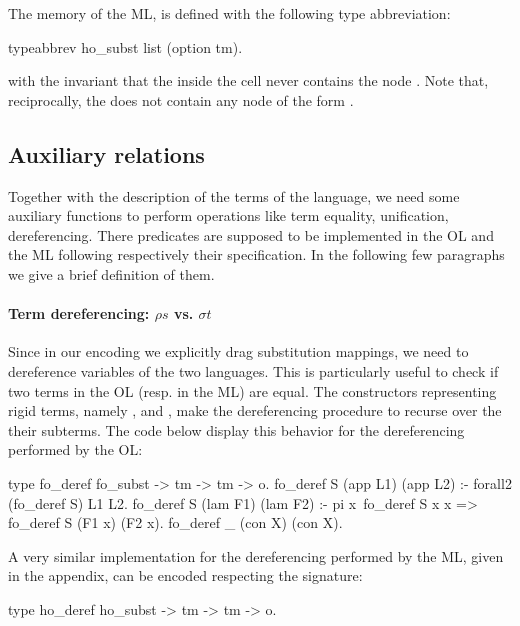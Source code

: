 \documentclass[sigconf,natbib=false]{acmart}
\begin{document}
The memory of the ML, is defined with the following type abbreviation:

\begin{elpicode}
  typeabbrev ho_subst list (option tm).
\end{elpicode}

\noindent
with the invariant that the  inside the cell never contains the node
. Note that, reciprocally, the  does not contain
any node of the form .

\subsection{Auxiliary relations}

Together with the description of the terms of the language, we need some
auxiliary functions to perform operations like term equality, unification,
dereferencing. There predicates are supposed to be implemented in the OL and the
ML following respectively their specification. In the following few paragraphs
we give a brief definition of them.

\paragraph{Term dereferencing: $\rho s$ vs. $\sigma t$}

Since in our encoding we explicitly drag substitution mappings, we need to
dereference variables of the two languages. This is particularly useful to check
if two terms in the OL (resp. in the ML) are equal. The constructors
representing rigid terms, namely ,  and ,
make the dereferencing procedure to recurse over the their subterms. The code
below display this behavior for the dereferencing performed by the OL:

\begin{elpicode}
  type fo_deref fo_subst -> tm -> tm -> o.
  fo_deref S (app L1) (app L2) :- forall2 (fo_deref S) L1 L2.
  fo_deref S (lam F1) (lam F2) :- 
    pi x\ fo_deref S x x => fo_deref S (F1 x) (F2 x).
  fo_deref _ (con X) (con X).
\end{elpicode}

A very similar implementation for the dereferencing performed by the ML, given 
in the appendix, can be encoded respecting the signature:

\begin{elpicode}
  type ho_deref ho_subst -> tm -> tm -> o.
\end{elpicode}
\end{document}
